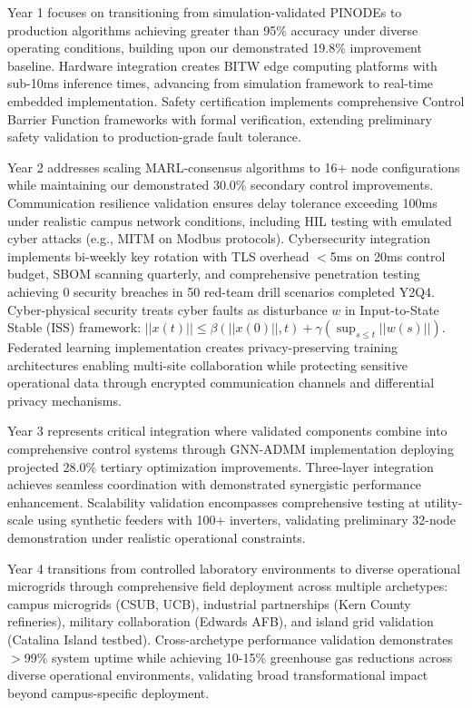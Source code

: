 \documentclass[12pt]{article}
\begin{document}
Year 1 focuses on transitioning from simulation-validated PINODEs to production algorithms achieving greater than 95\% accuracy under diverse operating conditions, building upon our demonstrated 19.8\% improvement baseline. Hardware integration creates BITW edge computing platforms with sub-10ms inference times, advancing from simulation framework to real-time embedded implementation. Safety certification implements comprehensive Control Barrier Function frameworks with formal verification, extending preliminary safety validation to production-grade fault tolerance.

Year 2 addresses scaling MARL-consensus algorithms to 16+ node configurations while maintaining our demonstrated 30.0\% secondary control improvements. Communication resilience validation ensures delay tolerance exceeding 100ms under realistic campus network conditions, including HIL testing with emulated cyber attacks (e.g., MITM on Modbus protocols). Cybersecurity integration implements bi-weekly key rotation with TLS overhead $<$5ms on 20ms control budget, SBOM scanning quarterly, and comprehensive penetration testing achieving 0 security breaches in 50 red-team drill scenarios completed Y2Q4. Cyber-physical security treats cyber faults as disturbance $w$ in Input-to-State Stable (ISS) framework: $||x(t)|| \leq \beta(||x(0)||, t) + \gamma(\sup_{s \leq t} ||w(s)||)$. Federated learning implementation creates privacy-preserving training architectures enabling multi-site collaboration while protecting sensitive operational data through encrypted communication channels and differential privacy mechanisms.

Year 3 represents critical integration where validated components combine into comprehensive control systems through GNN-ADMM implementation deploying projected 28.0\% tertiary optimization improvements. Three-layer integration achieves seamless coordination with demonstrated synergistic performance enhancement. Scalability validation encompasses comprehensive testing at utility-scale using synthetic feeders with 100+ inverters, validating preliminary 32-node demonstration under realistic operational constraints.

Year 4 transitions from controlled laboratory environments to diverse operational microgrids through comprehensive field deployment across multiple archetypes: campus microgrids (CSUB, UCB), industrial partnerships (Kern County refineries), military collaboration (Edwards AFB), and island grid validation (Catalina Island testbed). Cross-archetype performance validation demonstrates $>$99\% system uptime while achieving 10-15\% greenhouse gas reductions across diverse operational environments, validating broad transformational impact beyond campus-specific deployment.
\end{document}
